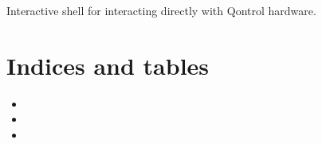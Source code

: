 \documentclass[letterpaper,10pt,english]{sphinxmanual}
\begin{document}
\begin{fulllineitems}
\label{\detokenize{qontrol:qontrol.run_interactive_shell}}
Interactive shell for interacting directly with Qontrol hardware.

\end{fulllineitems}



\chapter{Indices and tables}
\label{\detokenize{index:indices-and-tables}}\begin{itemize}
\item {} 

\item {} 

\item {} 

\end{itemize}


\renewcommand{\indexname}{Python Module Index}
\begin{sphinxtheindex}
\let\bigletter\sphinxstyleindexlettergroup
\bigletter{q}
\item\relax{}
\end{sphinxtheindex}

\renewcommand{\indexname}{Index}
\printindex
\end{document}
